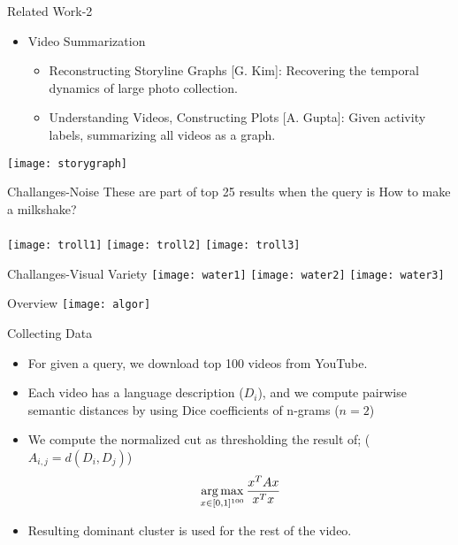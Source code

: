 \begin{frame}{Related Work-2}
  \begin{itemize}
    \item Video Summarization
    \begin{itemize}
      \item Reconstructing Storyline Graphs [G. Kim]: Recovering the temporal dynamics of large photo collection.
      \item Understanding Videos, Constructing Plots [A. Gupta]: Given activity labels, summarizing all videos as a graph.
    \end{itemize}
  \end{itemize}
  \vspace{5mm}
  \begin{center}
  \texttt{[image: storygraph]}
  \end{center}
\end{frame}

\begin{frame}{Challanges-Noise}
  These are part of top 25 results when the query is How to make a milkshake?
\\  \vspace{5mm} \\
\texttt{[image: troll1]}
\texttt{[image: troll2]}
\texttt{[image: troll3]}
\end{frame}


\begin{frame}{Challanges-Visual Variety}
\texttt{[image: water1]}
\texttt{[image: water2]}
\texttt{[image: water3]}
\end{frame}


\begin{frame}{Overview}
  \texttt{[image: algor]}
\end{frame}

\begin{frame}{Collecting Data}
  \begin{itemize}
    \item For given a query, we download top 100 videos from YouTube.
    \item Each video has a language description ($D_i$), and we compute pairwise semantic distances by using Dice coefficients of n-grams ($n=2$)
    \item We compute the normalized cut as thresholding the result of; ($A_{i,j}=d(D_i,D_j)$)
    \[
    \operatorname*{arg\,max}_{x \in [0,1]^{100}} \frac{x^TAx}{x^Tx}
    \]
    \item Resulting dominant cluster is used for the rest of the video.
  \end{itemize}
\end{frame}

